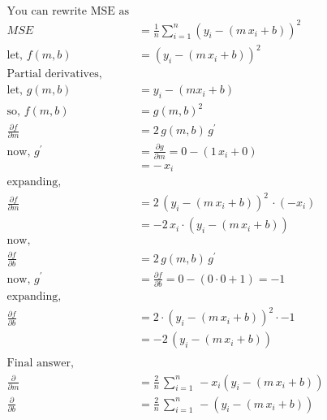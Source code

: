 \documentclass[11pt, a4paper]{article}
\begin{document}
\begin{align*}
    \text{You can rewrite MSE as}                                                                  \\
    MSE                           & = \frac{1}{n} \sum_{i = 1}^{n} (y_i - (m \, x_i + b))^2        \\
    \text{let, } f(m, b)          & = (y_i - (m \, x_i + b))^2                                     \\
    \text{Partial derivatives,}                                                                    \\
    \text{let, }  g(m, b)         & = y_i - (m x_i + b)                                            \\
    \text{so, } f(m, b)           & = g(m, b)^2                                                    \\
    \frac{\partial f}{\partial m} & = 2 \, g(m, b) \, g^\prime                                     \\
    \text{now, } g^\prime         & = \frac{\partial g}{\partial m} = 0 - (1\, x_i + 0)            \\
                                  & = -\, x_i                                                      \\
    \text{expanding, }                                                                             \\
    \frac{\partial f}{\partial m} & = 2 \, (y_i - (m\, x_i + b))^2 \, \cdot (-x_i)                 \\
                                  & = -2\, x_i \cdot (y_i - (m\, x_i + b))                         \\
    \text{now, }                                                                                   \\
    \frac{\partial f}{\partial b} & = 2 \, g(m, b)\, g^\prime                                      \\
    \text{now, } g^\prime         & = \frac{\partial f}{\partial b} = 0 - (0\cdot 0 + 1) = -1      \\
    \text{expanding, }                                                                             \\
    \frac{\partial f}{\partial b} & = 2 \cdot (y_i - (m\,x_i + b))^2 \cdot -1                      \\
                                  & = -2\, (y_i - (m\,x_i + b))                                    \\ \\
    \text{Final answer, }                                                                          \\
    \frac{\partial}{\partial m}   & = \frac{2}{n} \, \sum_{i = 1}^{n} \, -x_i (y_i - (m\,x_i + b)) \\
    \frac{\partial}{\partial b}   & = \frac{2}{n} \, \sum_{i = 1}^{n} \, -(y_i - (m\,x_i + b))
\end{align*}
\end{document}

